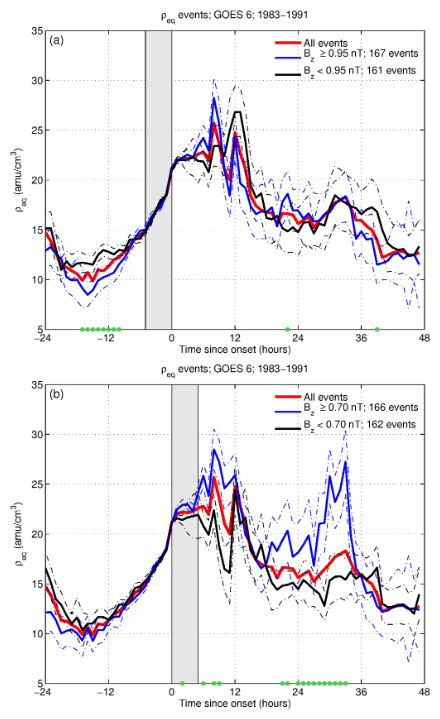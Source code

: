 \begin{figure}[tp!]
  \centering
  \includegraphics[scale=0.40]{2016SW001507R-p08a.eps}
  \includegraphics[scale=0.40]{2016SW001507R-p08b.eps}
\end{figure}
